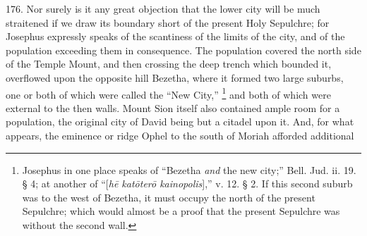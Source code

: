 176.
Nor surely is it any great objection that the lower city will be
much straitened if we draw its boundary short of the present Holy
Sepulchre; for Josephus expressly speaks of the scantiness of the
limits of the city, and of the population exceeding them in
consequence. The population covered the north side of the Temple
Mount, and then crossing the deep trench which bounded it, overflowed
upon the opposite hill Bezetha, where it formed two large suburbs, one
or both of which were called the ``New City,'' \footnote{Josephus in one place speaks of ``Bezetha \emph{and} the new city;''
Bell. Jud. ii. 19. § 4; at another of ``[\emph{h\={e} kat\={o}ter\={o}
kainopolis}],'' v. 12. § 2. If this second suburb was to the west
of Bezetha, it must occupy the north of the present Sepulchre; which
would almost be a proof that the present Sepulchre was without the
second wall.} and both of which were external to the then walls. Mount Sion
itself also contained ample room for a population, the original city
of David being but a citadel upon it. And, for what appears, the
eminence or ridge Ophel to the south of Moriah afforded additional

